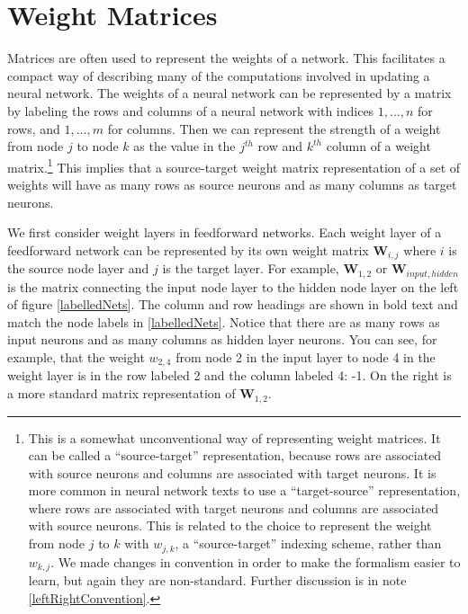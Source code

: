 \section{Weight Matrices}

Matrices are often used to represent the weights of a network. This facilitates a compact way of describing many of the computations involved in updating a neural network. The weights of a neural network can be represented by a matrix by labeling the rows and columns of a neural network with indices $1,\dots,n$ for rows, and $1,\dots,m$ for columns. Then we can represent the strength of a weight from node $j$ to node $k$ as the value in the $j^{th}$ row and $k^{th}$ column of a weight matrix.\footnote{\label{sourceTarget} This is a somewhat unconventional way of representing weight matrices. It can be called a ``source-target'' representation, because rows are associated with source neurons and columns are associated with target neurons. It is more common in neural network texts to use a ``target-source'' representation, where rows are associated with target neurons and columns are associated with source neurons. This is related to the choice to represent the weight from node $j$ to $k$ with $w_{j,k}$, a ``source-target'' indexing scheme, rather than $w_{k,j}$. We made changes in convention in order to make the formalism easier to learn, but again they are non-standard. Further discussion is in note \ref{leftRightConvention}.} This implies that a source-target weight matrix representation of a set of weights will have as many rows as source neurons and as many columns as target neurons.

We first consider weight layers in feedforward networks. Each weight layer of a feedforward network can be represented by its own weight matrix $\textbf{W}_{i,j}$ where $i$ is the source node layer and $j$ is the target layer. For example, $\textbf{W}_{1,2}$ or $\textbf{W}_{input,hidden}$ is the matrix connecting the input node layer to the hidden node layer on the left of figure \ref{labelledNets}. The column and row headings are shown in bold text and match the node labels in \ref{labelledNets}. Notice that there are as many rows as input neurons and as many columns as hidden layer neurons. You can see, for example, that the weight $w_{2,4}$ from node 2 in the input layer to node 4 in the weight layer is in the row labeled 2 and the column labeled 4: -1. On the right is a more standard matrix representation of $\textbf{W}_{1,2}$.

